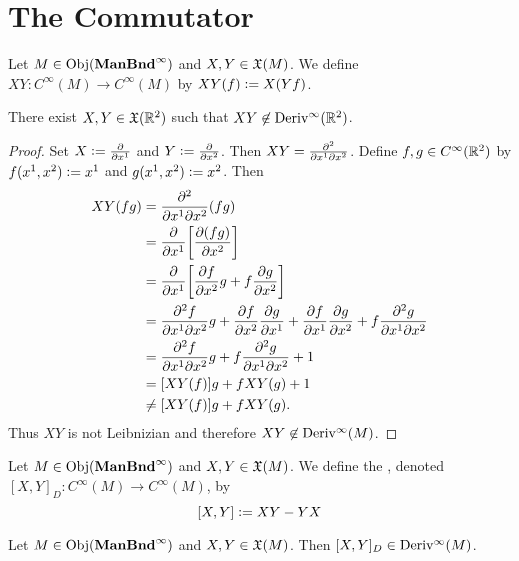 \documentclass{book}
\begin{document}
\newpage
\section{The Commutator}

\begin{defn}
	Let $M \in \operatorname{Obj}(\operatorname*{\text{\textbf{ManBnd}}^{\infty}})$ and $X,Y \in \mathfrak{X}(M)$. We define $XY: C^{\infty}(M) \rightarrow C^{\infty}(M)$ by $XY(f) \vcentcolon= X(Yf)$.
\end{defn}

\begin{ex}
	There exist $X, Y \in \mathfrak{X}(\mathbb{R}^2)$ such that $XY \not \in \operatorname{Deriv^{\infty}}(\mathbb{R}^2)$. 
\end{ex}

\begin{proof}
	Set $X \vcentcolon= \frac{\partial}{\partial x^1}$ and $Y \vcentcolon= \frac{\partial}{\partial x^2}$. Then $XY = \frac{\partial^2}{\partial x^1 \partial x^2}$. Define $f, g \in C^{\infty}(\mathbb{R}^2)$ by $f(x^1, x^2) \vcentcolon= x^1$ and $g(x^1, x^2) \vcentcolon= x^2$. Then 
	\begin{align*}
		XY(fg)
		& = \frac{\partial^2}{\partial x^1 \partial x^2}(fg) \\
		& = \frac{\partial}{\partial x^1} \bigg[ \frac{\partial(fg)}{\partial x^2}  \bigg] \\
		& = \frac{\partial}{\partial x^1} \bigg[ \frac{\partial f}{\partial x^2} g + f \frac{\partial g}{\partial x^2}   \bigg] \\
		& = \frac{\partial^2f}{\partial x^1 \partial x^2}g + \frac{\partial f}{\partial x^2} \frac{\partial g}{\partial x^1} + \frac{\partial f}{\partial x^1} \frac{\partial g}{\partial x^2} +  f\frac{\partial^2g}{\partial x^1 \partial x^2}  \\
		& = \frac{\partial^2f}{\partial x^1 \partial x^2}g + f\frac{\partial^2g}{\partial x^1 \partial x^2} + 1 \\
		& = [XY(f)]g + fXY(g) + 1 \\
		& \neq [XY(f)]g + fXY(g).
	\end{align*}
	Thus $XY$ is not Leibnizian and therefore $XY \not \in \operatorname{Deriv^{\infty}}(M)$.
\end{proof}

\begin{defn}
	Let $M \in \operatorname{Obj}(\operatorname*{\text{\textbf{ManBnd}}^{\infty}})$ and $X,Y \in \mathfrak{X}(M)$. We define the , denoted $[X, Y]_D : C^{\infty}(M) \rightarrow C^{\infty}(M)$, by 
	$$[X,Y] \vcentcolon= XY - YX$$
\end{defn}

\begin{ex}
	Let $M \in \operatorname{Obj}(\operatorname*{\text{\textbf{ManBnd}}^{\infty}})$ and $X,Y \in \mathfrak{X}(M)$. Then $[X,Y]_D \in \operatorname{Deriv^{\infty}}(M)$.
\end{ex}
\end{document}
